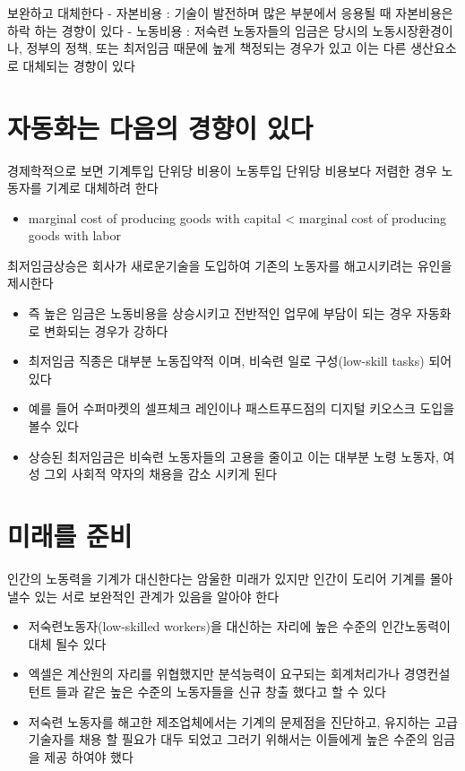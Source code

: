 \documentclass[
]{book}
\providecommand{\tightlist}{%
  \setlength{\itemsep}{0pt}\setlength{\parskip}{0pt}}
\begin{document}
보완하고 대체한다
- 자본비용 : 기술이 발전하며 많은 부분에서 응용될 때 자본비용은 하락 하는 경향이 있다
- 노동비용 : 저숙련 노동자들의 임금은 당시의 노동시장환경이나, 정부의 정책, 또는 최저임금 때문에 높게 책정되는 경우가 있고 이는 다른 생산요소로 대체되는 경향이 있다

\hypertarget{uxc790uxb3d9uxd654uxb294-uxb2e4uxc74cuxc758-uxacbduxd5a5uxc774-uxc788uxb2e4}{%
\section{자동화는 다음의 경향이 있다}\label{uxc790uxb3d9uxd654uxb294-uxb2e4uxc74cuxc758-uxacbduxd5a5uxc774-uxc788uxb2e4}}

경제학적으로 보면 기계투입 단위당 비용이 노동투입 단위당 비용보다 저렴한 경우
노동자를 기계로 대체하려 한다

\begin{itemize}
\tightlist
\item
  marginal cost of producing goods with capital \textless{} marginal cost of producing goods with labor
\end{itemize}

최저임금상승은 회사가 새로운기술을 도입하여 기존의 노동자를 해고시키려는 유인을 제시한다

\begin{itemize}
\tightlist
\item
  즉 높은 임금은 노동비용을 상승시키고 전반적인 업무에 부담이 되는 경우 자동화로 변화되는 경우가 강하다
\item
  최저임금 직종은 대부분 노동집약적 이며, 비숙련 일로 구성(low-skill tasks) 되어있다
\item
  예를 들어 수퍼마켓의 셀프체크 레인이나 패스트푸드점의 디지털 키오스크 도입을 볼수 있다
\item
  상승된 최저임금은 비숙련 노동자들의 고용을 줄이고 이는 대부분 노령 노동자, 여성 그외 사회적 약자의 채용을 감소 시키게 된다
\end{itemize}

\hypertarget{uxbbf8uxb798uxb97c-uxc900uxbe44}{%
\section{미래를 준비}\label{uxbbf8uxb798uxb97c-uxc900uxbe44}}

인간의 노동력을 기계가 대신한다는 암울한 미래가 있지만 인간이 도리어 기계를 몰아 낼수 있는 서로 보완적인 관계가 있음을 알아야 한다

\begin{itemize}
\tightlist
\item
  저숙련노동자(low-skilled workers)을 대신하는 자리에 높은 수준의 인간노동력이 대체 될수 있다
\item
  엑셀은 계산원의 자리를 위협했지만 분석능력이 요구되는 회계처리가나 경영컨설턴트 들과 같은 높은 수준의 노동자들을 신규 창출 했다고 할 수 있다
\item
  저숙련 노동자를 해고한 제조업체에서는 기계의 문제점을 진단하고, 유지하는 고급 기술자를 채용 할 필요가 대두 되었고 그러기 위해서는 이들에게 높은 수준의
  임금을 제공 하여야 했다
\end{itemize}
\end{document}
